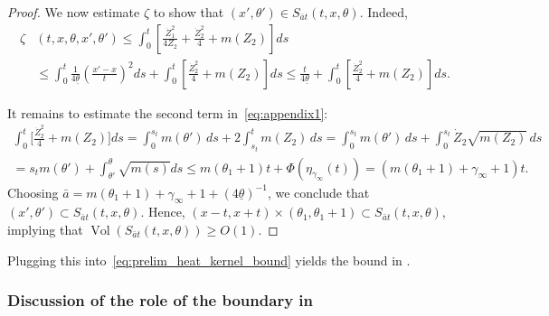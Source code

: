 \documentclass[11pt]{article}    %
\DeclareMathOperator{\Vol}{Vol}
\begin{document}
\begin{proof}
We now estimate $\zeta$ to show that $(x',\theta') \in S_{\overline a t}(t,x,\theta)$.  Indeed, 
\begin{equation}\label{eq:appendix1}
\begin{split}
\zeta&(t,x,\theta,x',\theta')
	\leq \int_0^t \left[\frac{\dot Z_1^2}{4 Z_2} + \frac{\dot Z_2^2}{4} + m(Z_2) \right] ds\\
	&\leq \int_{0}^t \frac{1}{4 \underline\theta} \left( \frac{x'-x}{t} \right)^2 ds + \int_0^{t} \left[ \frac{\dot Z_2^2}{4} + m(Z_2) \right] ds
	\leq \frac{t}{4 \underline\theta} + \int_0^{t} \left[ \frac{\dot Z_2^2}{4} + m(Z_2) \right] ds.
\end{split}
\end{equation}

It remains to estimate the second term in~\eqref{eq:appendix1}:
\begin{multline*}
\int_0^{t} \Big[ \frac{\dot Z_2^2}{4} + m(Z_2) \Big] ds
	= \int_0^{s_t} m(\theta') \, ds + 2\int_{s_t}^{t} m(Z_2) \,ds
	= \int_0^{s_t} m(\theta') \,ds + \int_0^{s_t} \dot Z_2 \sqrt{m(Z_2)} \, ds\\
	= s_t m(\theta') + \int_{\theta'}^{\theta} \sqrt{m(s)} ds
	\leq m(\theta_1 + 1) t + \Phi( \eta_{\gamma_\infty}(t))
	= \left( m(\theta_1 + 1) + \gamma_\infty + 1\right)t.
\end{multline*}
Choosing $\bar a = m(\theta_1+1) + \gamma_\infty + 1 + (4\underline \theta)^{-1}$,
%
we conclude that $(x',\theta') \subset S_{\overline a t}(t,x,\theta)$.  Hence, $(x-t,x+t) \times (\theta_1, \theta_1 +1)\subset S_{\bar a t}(t,x,\theta)$, implying that $\Vol(S_{\bar a t}(t,x,\theta)) \geq O(1)$.
\end{proof}

Plugging this into~\eqref{eq:prelim_heat_kernel_bound} yields the bound in .









\subsubsection*{Discussion of the role of the boundary in \cite[Corollary 3.2]{LiYau}}
\end{document}
